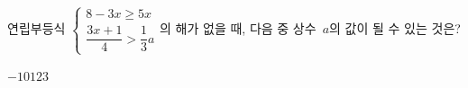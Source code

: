연립부등식 $\begin{cases} 8-3x\ge 5x \\ \dfrac{3x+1}{4}>\dfrac{1}{3}a \end{cases}$의 해가 없을 때, 다음 중 상수~$a$의 값이 될 수 있는 것은?
\begin{choices32}{$-1$}{$0$}{$1$}{$2$}{$3$}\end{choices32}
